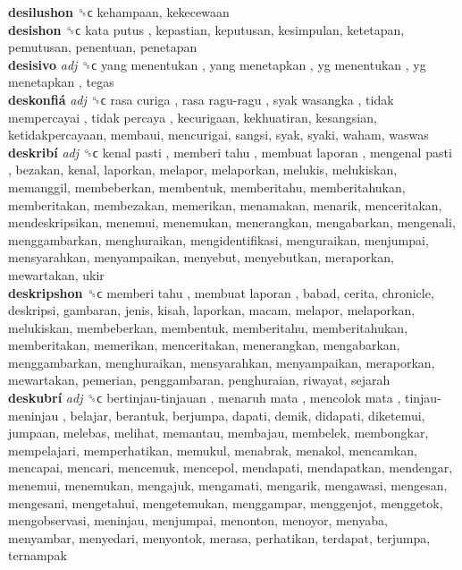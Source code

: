 \textbf{desilushon} ␝ϲ  kehampaan, kekecewaan  \\
\textbf{desishon} ␝ϲ   kata putus , kepastian, keputusan, kesimpulan, ketetapan, pemutusan, penentuan, penetapan  \\
\textbf{desisivo} \emph{adj}  ␝ϲ   yang menentukan ,  yang menetapkan ,  yg menentukan ,  yg menetapkan , tegas  \\
\textbf{deskonfiá} \emph{adj}  ␝ϲ   rasa curiga ,  rasa ragu-ragu ,  syak wasangka ,  tidak mempercayai ,  tidak percaya , kecurigaan, kekhuatiran, kesangsian, ketidakpercayaan, membaui, mencurigai, sangsi, syak, syaki, waham, waswas  \\
\textbf{deskribí} \emph{adj}  ␝ϲ   kenal pasti ,  memberi tahu ,  membuat laporan ,  mengenal pasti , bezakan, kenal, laporkan, melapor, melaporkan, melukis, melukiskan, memanggil, membeberkan, membentuk, memberitahu, memberitahukan, memberitakan, membezakan, memerikan, menamakan, menarik, menceritakan, mendeskripsikan, menemui, menemukan, menerangkan, mengabarkan, mengenali, menggambarkan, menghuraikan, mengidentifikasi, menguraikan, menjumpai, mensyarahkan, menyampaikan, menyebut, menyebutkan, meraporkan, mewartakan, ukir  \\
\textbf{deskripshon} ␝ϲ   memberi tahu ,  membuat laporan , babad, cerita, chronicle, deskripsi, gambaran, jenis, kisah, laporkan, macam, melapor, melaporkan, melukiskan, membeberkan, membentuk, memberitahu, memberitahukan, memberitakan, memerikan, menceritakan, menerangkan, mengabarkan, menggambarkan, menghuraikan, mensyarahkan, menyampaikan, meraporkan, mewartakan, pemerian, penggambaran, penghuraian, riwayat, sejarah  \\
\textbf{deskubrí} \emph{adj}  ␝ϲ   bertinjau-tinjauan ,  menaruh mata ,  mencolok mata ,  tinjau-meninjau , belajar, berantuk, berjumpa, dapati, demik, didapati, diketemui, jumpaan, melebas, melihat, memantau, membajau, membelek, membongkar, mempelajari, memperhatikan, memukul, menabrak, menakol, mencamkan, mencapai, mencari, mencemuk, mencepol, mendapati, mendapatkan, mendengar, menemui, menemukan, mengajuk, mengamati, mengarik, mengawasi, mengesan, mengesani, mengetahui, mengetemukan, menggampar, menggenjot, menggetok, mengobservasi, meninjau, menjumpai, menonton, menoyor, menyaba, menyambar, menyedari, menyontok, merasa, perhatikan, terdapat, terjumpa, ternampak  \\
